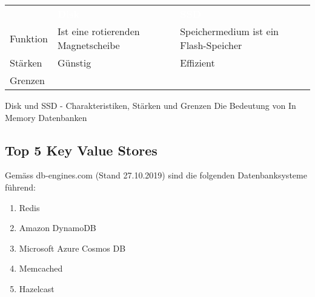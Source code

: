 \begin{table}[H]
	\begin{tabular}{|p{1.6cm}|p{6.9cm}|p{6.9cm}|}
		\hline
		\rowcolor{black}
		&
		\textcolor{white}{\textbf{Disk}} & \textcolor{white}{\textbf{SSD}}
		\\
		Funktion & Ist eine rotierenden Magnetscheibe & Speichermedium ist ein Flash-Speicher\\ 
		\hline
		Stärken & Günstig & Effizient \\
		\hline
		Grenzen &  &  \\
		\hline 
	\end{tabular}
\end{table}

Disk und SSD - Charakteristiken, Stärken und Grenzen
Die Bedeutung von In Memory Datenbanken

\subsection{Top 5 Key Value Stores}
Gemäss db-engines.com (Stand 27.10.2019) sind die folgenden Datenbanksysteme führend:
\begin{enumerate}
\item Redis
\item Amazon DynamoDB
\item Microsoft Azure Cosmos DB
\item Memcached
\item Hazelcast
\end{enumerate}
